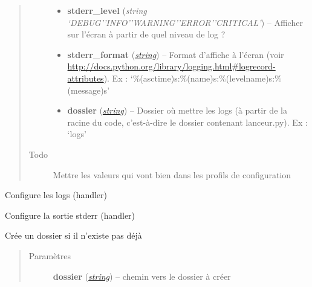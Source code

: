 \documentclass[letterpaper,10pt,french]{sphinxmanual}
\begin{document}
\begin{fulllineitems}
\begin{quote}
\begin{description}
\begin{itemize}
\item {} 
\textbf{stderr\_level} (\emph{string `DEBUG'\textbar{}'INFO'\textbar{}'WARNING'\textbar{}'ERROR'\textbar{}'CRITICAL'}) -- Afficher sur l'écran à partir de quel niveau de log ?

\item {} 
\textbf{stderr\_format} (\href{http://docs.python.org/library/string.html\#module-string}{\emph{string}}) -- Format d'affiche à l'écran (voir \href{http://docs.python.org/library/logging.html\#logrecord-attributes}{http://docs.python.org/library/logging.html\#logrecord-attributes}). Ex : `\%(asctime)s:\%(name)s:\%(levelname)s:\%(message)s'

\item {} 
\textbf{dossier} (\href{http://docs.python.org/library/string.html\#module-string}{\emph{string}}) -- Dossier où mettre les logs (à partir de la racine du code, c'est-à-dire le dossier contenant lanceur.py). Ex : `logs'

\end{itemize}

\item[{Todo }] \leavevmode
Mettre les valeurs qui vont bien dans les profils de configuration

\end{description}\end{quote}

\begin{fulllineitems}
\label{log:lib.log.Log.configurer_logs}
Configure les logs (handler)

\end{fulllineitems}


\begin{fulllineitems}
\label{log:lib.log.Log.configurer_stderr}
Configure la sortie stderr (handler)

\end{fulllineitems}


\begin{fulllineitems}
\label{log:lib.log.Log.creer_dossier}
Crée un dossier si il n'existe pas déjà
\begin{quote}\begin{description}
\item[{Paramètres}] \leavevmode
\textbf{dossier} (\href{http://docs.python.org/library/string.html\#module-string}{\emph{string}}) -- chemin vers le dossier à créer


\end{description}
\end{quote}
\end{fulllineitems}
\end{fulllineitems}
\end{document}
